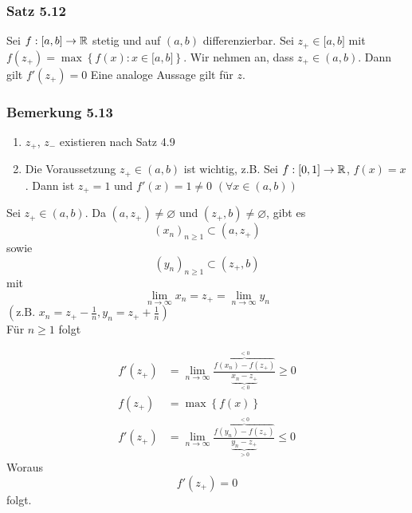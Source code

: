 \subsubsection*{Satz 5.12}\label{satz5.12}
Sei $f:\lbrack a,b\rbrack\to\mathbb{R}$ stetig und auf $\left( a,b\right)$ differenzierbar. Sei $z_+\in\lbrack a,b\rbrack$ mit $f\left( z_+\right) =\max\left\{ f\left( x\right) : x\in\lbrack a,b\rbrack\right\}$. Wir nehmen an, dass $z_+\in\left( a,b\right)$. Dann gilt $f'\left( z_+\right) = 0$ Eine analoge Aussage gilt für $z$.
\subsubsection*{Bemerkung 5.13}
\begin{enumerate}
\item $z_+$, $z_-$ existieren nach Satz 4.9
\item Die Voraussetzung $z_+\in\left( a,b \right)$ ist wichtig, z.B. Sei $f:\lbrack 0,1\rbrack\to\mathbb{R}$, $f(x)=x$. Dann ist $z_+=1$ und $f'(x)=1\not=0$ $\left( \forall x\in\left( a,b\right)\right)$
\end{enumerate}

\begin{beweis}{}
Sei $z_+\in\left( a,b\right)$. Da $\left( a,z_+\right)\not=\varnothing$ und $\left( z_+,b\right)\not=\varnothing$, gibt es
\[\left( x_n\right)_{n\geq 1}\subset\left( a,z_+\right)\]
sowie
\[\left( y_n\right)_{n\geq 1}\subset\left( z_+,b\right)\]
mit
\[\mathop {\lim }\limits_{n \to \infty } {x_n} = {z_ + } = \mathop {\lim }\limits_{n \to \infty } {y_n}\]
$\left( \text{z.B. }{x_n} = {z_ + } - \frac{1}{n}, {y_n} = {z_ + } + \frac{1}{n}\right)$\\

Für $n\geq 1$ folgt

\begin{align*}
f'\left( {{z_ + }} \right) &= \mathop {\lim }\limits_{n \to \infty } \frac{{\overbrace {f\left( {{x_n}} \right) - f\left( {{z_ + }} \right)}^{ < 0}}}{{\underbrace {{x_n} - {z_ + }}_{ < 0}}} \ge 0\\
f\left( {{z_ + }} \right) &= \max \left\{ {f\left( x \right)} \right\}\\
f'\left( {{z_ + }} \right) &= \mathop {\lim }\limits_{n \to \infty } \frac{{\overbrace {f\left( {{y_n}} \right) - f\left( {{z_ + }} \right)}^{ < 0}}}{{\underbrace {{y_n} - {z_ + }}_{ > 0}}} \le 0
\end{align*}
Woraus \[ f'\left( z_+\right) = 0\] folgt.
\end{beweis}

